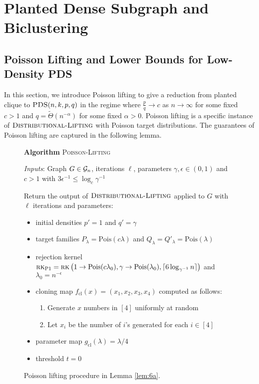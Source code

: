 \section{Planted Dense Subgraph and Biclustering}

\label{s:pds}

\subsection{Poisson Lifting and Lower Bounds for Low-Density PDS}\label{app:F.1}

In this section, we introduce Poisson lifting to give a reduction from planted clique to $\textsc{PDS}(n, k, p, q)$ in the regime where $\frac{p}{q} \to c$ as $n \to \infty$ for some fixed $c > 1$ and $q = \tilde{\Theta}(n^{-\alpha})$ for some fixed $\alpha > 0$. Poisson lifting is a specific instance of $\textsc{Distributional-Lifting}$ with Poisson target distributions. The guarantees of Poisson lifting are captured in the following lemma.

\begin{figure}[t!]
\begin{algbox}
\textbf{Algorithm} \textsc{Poisson-Lifting}

\vspace{2mm}

\textit{Inputs}: Graph $G \in \mathcal{G}_n$, iterations $\ell$, parameters $\gamma, \epsilon \in (0, 1)$ and $c > 1$ with $3\epsilon^{-1} \le \log_c \gamma^{-1}$

\vspace{2mm}

Return the output of $\textsc{Distributional-Lifting}$ applied to $G$ with $\ell$ iterations and parameters:
\begin{itemize}
\item initial densities $p' = 1$ and $q' = \gamma$
\item target families $P_{\lambda} = \text{Pois}(c\lambda)$ and $Q_{\lambda} = Q'_\lambda = \text{Pois}(\lambda)$
\item rejection kernel $\textsc{rk}_{\text{P1}} = \textsc{rk}\left( 1 \to \text{Pois}(c\lambda_0), \gamma \to \text{Pois}(\lambda_0), \lceil 6 \log_{\gamma^{-1}} n \rceil \right)$ and $\lambda_0 = n^{-\epsilon}$
\item cloning map $f_{\text{cl}}(x) = (x_1, x_2, x_3, x_4)$ computed as follows:
\begin{enumerate}
\item Generate $x$ numbers in $[4]$ uniformly at random
\item Let $x_i$ be the number of $i$'s generated for each $i \in [4]$
\end{enumerate}
\item parameter map $g_{\text{cl}}(\lambda) = \lambda/4$
\item threshold $t = 0$
\end{itemize}
\vspace{1mm}
\end{algbox}
\caption{Poisson lifting procedure in Lemma \ref{lem:6a}.}
\label{fig:pois}
\end{figure}

